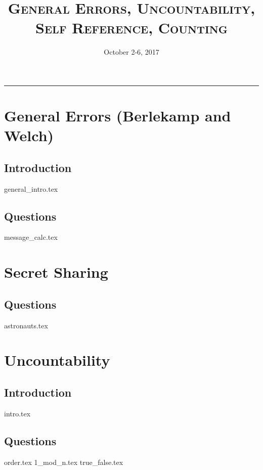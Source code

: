 \documentclass{exam}
\title{\textsc{General Errors, Uncountability, Self Reference, Counting}}
\date{October 2-6, 2017}
\begin{document}
\maketitle
\rule{\textwidth}{0.15em}
\fontsize{12}{15}\selectfont

\section{General Errors (Berlekamp and Welch)}
\subsection{Introduction}
{general_intro.tex}
\subsection{Questions}
\begin{questions}
{message_calc.tex}
\end{questions}

\newpage

\section{Secret Sharing}
\subsection{Questions}
\begin{questions}
{astronauts.tex}
\end{questions}

\section{Uncountability}
\subsection{Introduction}
\begin{questions}
{intro.tex}
\end{questions}
\subsection{Questions}
\begin{questions}
{order.tex}
{1_mod_n.tex}
{true_false.tex}
\end{questions}
\end{document}
